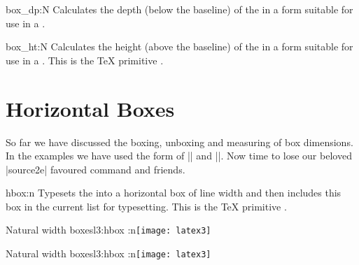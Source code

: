 \begin{docCommand}{box_dp:N}{ }
   Calculates the depth (below the baseline) of the 
   in a form suitable for use in a .
\end{docCommand}

\begin{docCommand}{box_ht:N}{ }
   Calculates the height (above the baseline) of the 
   in a form suitable for use in a .
  This is the \TeX{} primitive .
 \end{docCommand}


\section{Horizontal Boxes}
\label{l3:hboxes}

So far we have discussed the boxing, unboxing and measuring of box dimensions. In the examples we have used
the  form of |\hbox| and |\vbox|.  Now time to lose our  beloved |source2e| favoured command  and friends. 

 \begin{docCommand}{hbox:n}{ }
   Typesets the  into a horizontal box of line width and then includes this box in the current list for typesetting.
   This is the \TeX{} primitive .
 \end{docCommand}

\begin{texexample}{Natural width boxes}{l3:hbox}
\ExplSyntaxOn
\hbox:n{\texttt{[image: latex3]}}
\ExplSyntaxOff
\end{texexample}

\begin{texexample}{Natural width boxes}{l3:hbox}
\ExplSyntaxOn
\hbox:n{\texttt{[image: latex3]}}
\ExplSyntaxOff
\end{texexample}


